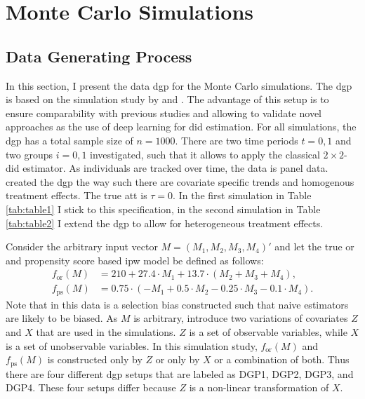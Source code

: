 \section{Monte Carlo Simulations}


\subsection{Data Generating Process}

In this section, I present the data \ac{dgp} for the Monte Carlo simulations.
The \ac{dgp} is based on the simulation study by \citet{kang2007demystifying} and \citet{santannaDoublyRobustDifferenceindifferences2020}.
The advantage of this setup is to ensure comparability with previous studies and allowing to validate novel approaches as the use of deep learning for \ac{did} estimation.
For all simulations, the \ac{dgp} has a total sample size of $n=1000$.
There are two time periods $t=0,1$ and two groups $i=0,1$ investigated, such that it allows to apply the classical $2\times2$-\ac{did} estimator.
As individuals are tracked over time, the data is panel data.
\citet{kang2007demystifying} created the \ac{dgp} the way such there are covariate specific trends and homogenous treatment effects.
The true \ac{att} is $\tau = 0$.
In the first simulation in Table \ref{tab:table1} I stick to this specification, in the second simulation in Table \ref{tab:table2} I extend the \ac{dgp} to allow for heterogeneous treatment effects.

Consider the arbitrary input vector $M = (M_1, M_2, M_3, M_4)'$ and let the true \ac{or} and propensity score based \ac{ipw} model be defined as follows:
\begin{align}
    f_{\text{or}}(M) &= 210 + 27.4 \cdot M_1 + 13.7 \cdot (M_2 + M_3 + M_4), \\
    f_{\text{ps}}(M) &= 0.75 \cdot (-M_1 + 0.5 \cdot M_2 - 0.25 \cdot M_3 - 0.1 \cdot M_4).
\end{align}
Note that in this data is a selection bias constructed \citep{kang2007demystifying} such that naive estimators are likely to be biased.
As $M$ is arbitrary, \citet{kang2007demystifying} introduce two variations of covariates $Z$ and $X$ that are used in the simulations.
$Z$ is a set of observable variables, while $X$ is a set of unobservable variables.
In this simulation study, $f_{\text{or}}(M)$ and $f_{\text{ps}}(M)$ is constructed only by $Z$ or only by $X$ or a combination of both.
Thus there are four different \ac{dgp} setups that are labeled as DGP1, DGP2, DGP3, and DGP4.
These four setups differ because $Z$ is a non-linear transformation of $X$.

